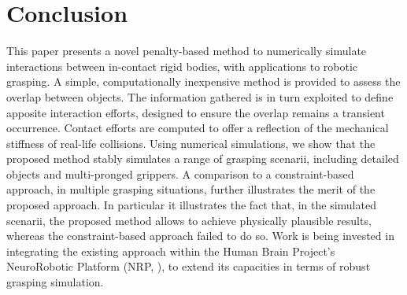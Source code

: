 \section{Conclusion}\label{sec:conclusion}
%
This paper presents a novel penalty-based method to numerically simulate interactions between in-contact rigid bodies, with applications to robotic grasping. A simple, computationally inexpensive method is provided to assess the overlap between objects. The information gathered is in turn exploited to define apposite interaction efforts, designed to ensure the overlap remains a transient occurrence. Contact efforts are computed to offer a reflection of the mechanical stiffness of real-life collisions. Using numerical simulations, we show that the proposed method stably simulates a range of grasping scenarii, including detailed objects and multi-pronged grippers. A comparison to a constraint-based approach, in multiple grasping situations, further illustrates the merit of the proposed approach. In particular it illustrates the fact that, in the simulated scenarii, the proposed method allows to achieve physically plausible results, whereas the constraint-based approach failed to do so.
Work is being invested in integrating the existing approach within the Human Brain Project's NeuroRobotic Platform (NRP, \cite{knoll2016}), to extend its capacities in terms of robust grasping simulation. 